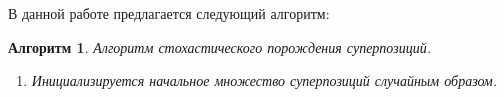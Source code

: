 \documentclass[12pt,a4paper]{amsart}
\newtheorem{algo}{Алгоритм}
\begin{document}
В данной работе предлагается следующий алгоритм:

\begin{algo}
  Алгоритм стохастического порождения суперпозиций.
  \begin{enumerate}
	\item Инициализируется начальное множество суперпозиций случайным образом.
  \end{enumerate}
\end{algo}


\extrasrussian

\end{document}
